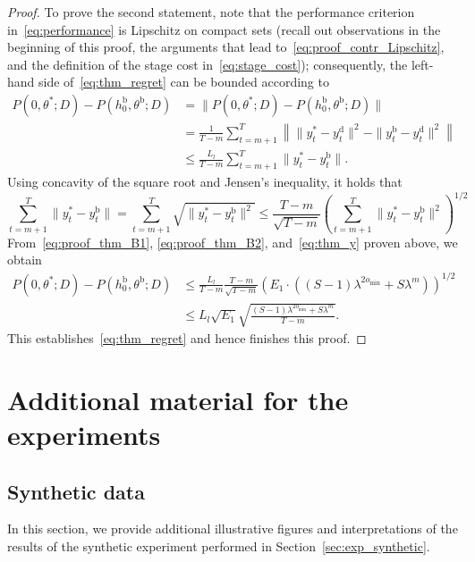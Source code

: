 \documentclass{article} %
\begin{document}
\begin{proof}
	To prove the second statement, note that the performance criterion in~\eqref{eq:performance} is Lipschitz on compact sets (recall out observations in the beginning of this proof, the arguments that lead to~\eqref{eq:proof_contr_Lipschitz}, and the definition of the stage cost in~\eqref{eq:stage_cost}); consequently, the left-hand side of~\eqref{eq:thm_regret} can be bounded according to
	\begin{align}
		P(0,\theta^*;D) - P(h^\mathrm{b}_0,\theta^\mathrm{b};D)
		&= \|P(0,\theta^*;D) -  P(h^\mathrm{b}_0,\theta^\mathrm{b};D)\|\nonumber \\
		&= \frac{1}{T-m}\sum_{t=m+1}^{T}\left\|\|y^*_t-y^\mathrm{d}_t\|^2 - \|y^\mathrm{b}_t-y^\mathrm{d}_t\|^2\right\|\nonumber \\
		&\leq \frac{L_l}{T-m}\sum_{t=m+1}^{T}\|y^*_t-y^\mathrm{b}_t\|.
		\label{eq:proof_thm_B1}
	\end{align}
	Using concavity of the square root and Jensen's inequality, it holds that
	\begin{equation}
		\sum_{t=m+1}^{T}\|y^*_t-y^\mathrm{b}_t\|
		= \sum_{t=m+1}^{T}\sqrt{\|y^*_t-y^\mathrm{b}_t\|^2}
		\leq \frac{T-m}{\sqrt{T-m}}\left(\sum_{t=m+1}^{T}\|y^*_t-y^\mathrm{b}_t\|^2\right)^{1/2} \label{eq:proof_thm_B2}
	\end{equation}
	From~\eqref{eq:proof_thm_B1}, \eqref{eq:proof_thm_B2}, and~\eqref{eq:thm_y} proven above, we obtain
	\begin{align*}
		P(0,\theta^*;D) - P(h^\mathrm{b}_0,\theta^\mathrm{b};D)
		&\leq \frac{L_l}{T-m}\frac{T-m}{\sqrt{T-m}}\left(E_1 \cdot \left((S-1)\lambda^{2o_{\min}} + S\lambda^m\right)\right)^{1/2}\\
		&\leq L_l\sqrt{E_1}\sqrt{\frac{(S-1)\lambda^{2o_{\min}} + S\lambda^m}{T-m}}.
	\end{align*}
	This establishes~\eqref{eq:thm_regret} and hence finishes this proof.
\end{proof}

\section{Additional material for the experiments}\label{app:exp}

\subsection{Synthetic data}\label{app:exp_academic}

In this section, we provide additional illustrative figures and interpretations of the results of the synthetic experiment performed in Section~\ref{sec:exp_synthetic}.
\end{document}
